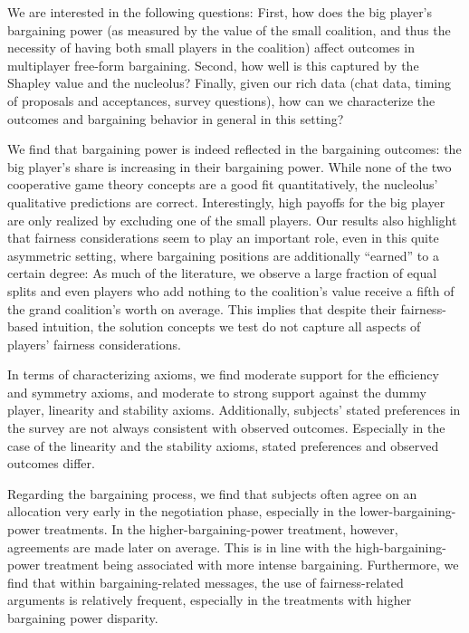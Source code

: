 We are interested in the following questions: First, how does the big player's bargaining power (as measured by the value of the small coalition, and thus the necessity of having both small players in the coalition) affect outcomes in multiplayer free-form bargaining. Second, how well is this captured by the Shapley value and the nucleolus? Finally, given our rich data (chat data, timing of proposals and acceptances, survey questions), how can we characterize the outcomes and bargaining behavior in general in this setting?





We find that bargaining power is indeed reflected in the bargaining outcomes: the big player's share is increasing in their bargaining power. While none of the two cooperative game theory concepts are a good fit quantitatively, the nucleolus' qualitative predictions are correct. Interestingly, high payoffs for the big player are only realized by excluding one of the small players. Our results also highlight that fairness considerations seem to play an important role, even in this quite asymmetric setting, where bargaining positions are additionally ``earned'' to a certain degree: As much of the literature, we observe a large fraction of equal splits and even players who add nothing to the coalition's value receive a fifth of the grand coalition's worth on average. This implies that despite their fairness-based intuition, the solution concepts we test do not capture all aspects of players' fairness considerations.

In terms of characterizing axioms, we find moderate support for the efficiency and symmetry axioms, and moderate to strong support against the dummy player, linearity and stability axioms. Additionally, subjects' stated preferences in the survey are not always consistent with observed outcomes. Especially in the case of the linearity and the stability axioms, stated preferences and observed outcomes differ.


Regarding the bargaining process, we find that subjects often agree on an allocation very early in the negotiation phase, especially in the lower-bargaining-power treatments. In the higher-bargaining-power treatment, however, agreements are made later on average. This is in line with the high-bargaining-power treatment being associated with more intense bargaining. Furthermore, we find that within bargaining-related messages, the use of fairness-related arguments is relatively frequent, especially in the treatments with higher bargaining power disparity. 

